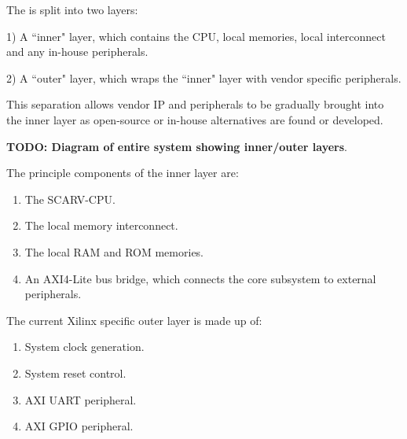 
The \SCARVSOC is split into two layers:

1) A ``inner" layer, which contains the CPU, local memories, local
   interconnect and any in-house peripherals.

2) A ``outer" layer, which wraps the ``inner" layer with vendor specific
   peripherals.

This separation allows vendor IP and peripherals to be gradually brought
into the inner layer as open-source or in-house alternatives are
found or developed.

{\bf TODO: Diagram of entire system showing inner/outer layers}.


\noindent The principle components of the inner layer are:

\begin{enumerate}
\item The SCARV-CPU.
\item The local memory interconnect.
\item The local RAM and ROM memories.
\item An AXI4-Lite bus bridge, which connects the core subsystem to
      external peripherals.
\end{enumerate}


\noindent The current Xilinx specific outer layer is made up of:

\begin{enumerate}
\item System clock generation.
\item System reset control.
\item AXI UART peripheral.
\item AXI GPIO peripheral.
\end{enumerate}

